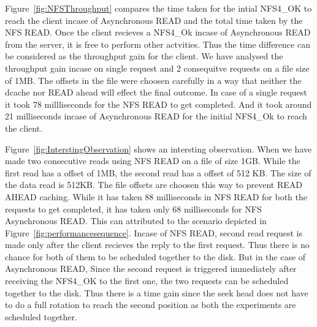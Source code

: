 	Figure~\ref{fig:NFSThroughput} compares the  time taken for the intial NFS4\_OK to reach the client incase of Asynchronous READ and the total time taken by the NFS READ.
Once the client recieves a NFS4\_Ok incase of Asynchronous READ from the server, it is free to perform other actvities. Thus the time difference can be considered as the throughput gain for the client. We have analysed the throughput gain incase on single request and 2 consequitve requests on a file size of 1MB. The offsets in the file were choosen carefully in a way that neither the dcache nor READ ahead will effect the final outcome. In case of a single request it took 78 millliseconds for the NFS READ to get completed. And it took around 21 milliseconds incase of Asynchronous READ for the initial NFS4\_Ok  to reach the client. 




 Figure~\ref{fig:InterstingObservation} shows an intersting observation. When we have made two consecutive reads  using NFS READ on a file of size 1GB. While the first read has a offset of 1MB, the second read has a offset of 512 KB. The size of the data read is 512KB. The file offsets are choosen this way to prevent READ AHEAD caching. While it has taken 88 milliseconds  in NFS READ for both the requests to get completed, it has taken only 68 milliseconds for NFS Asynchronous READ. This can attributed to the scenario depicted  in   Figure~\ref{fig:performancesequence}. Incase of NFS READ, second read request is made only after the client recieves the reply to the first request. Thus there is no chance for both of them to be scheduled together to the disk. But in the case of Asynchronous READ, Since the second request is triggered immediately after receiving the NFS4\_OK to the first one, the two requests can be scheduled together to the disk. Thus there is a time gain since the seek head does not have to do a full rotation to reach the second position as both the experiments are scheduled together.    







